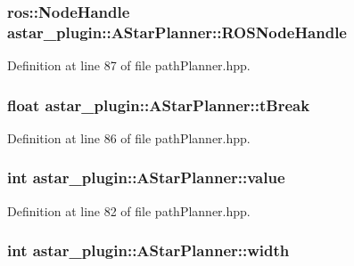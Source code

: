 \subsubsection[{\texorpdfstring{R\+O\+S\+Node\+Handle}{ROSNodeHandle}}]{\setlength{\rightskip}{0pt plus 5cm}ros\+::\+Node\+Handle astar\+\_\+plugin\+::\+A\+Star\+Planner\+::\+R\+O\+S\+Node\+Handle}\hypertarget{classastar__plugin_1_1_a_star_planner_ab20d703c7c32c96a523295cf07f8ef99}{}\label{classastar__plugin_1_1_a_star_planner_ab20d703c7c32c96a523295cf07f8ef99}


Definition at line 87 of file path\+Planner.\+hpp.

\subsubsection[{\texorpdfstring{t\+Break}{tBreak}}]{\setlength{\rightskip}{0pt plus 5cm}float astar\+\_\+plugin\+::\+A\+Star\+Planner\+::t\+Break}\hypertarget{classastar__plugin_1_1_a_star_planner_aae46db226358860bb296612e97a67617}{}\label{classastar__plugin_1_1_a_star_planner_aae46db226358860bb296612e97a67617}


Definition at line 86 of file path\+Planner.\+hpp.

\subsubsection[{\texorpdfstring{value}{value}}]{\setlength{\rightskip}{0pt plus 5cm}int astar\+\_\+plugin\+::\+A\+Star\+Planner\+::value}\hypertarget{classastar__plugin_1_1_a_star_planner_afb117804426fe5f1a9a882a0da06047a}{}\label{classastar__plugin_1_1_a_star_planner_afb117804426fe5f1a9a882a0da06047a}


Definition at line 82 of file path\+Planner.\+hpp.

\subsubsection[{\texorpdfstring{width}{width}}]{\setlength{\rightskip}{0pt plus 5cm}int astar\+\_\+plugin\+::\+A\+Star\+Planner\+::width}\hypertarget{classastar__plugin_1_1_a_star_planner_a712676c797f8a99a81b7aa48e02d227b}{}\label{classastar__plugin_1_1_a_star_planner_a712676c797f8a99a81b7aa48e02d227b}


